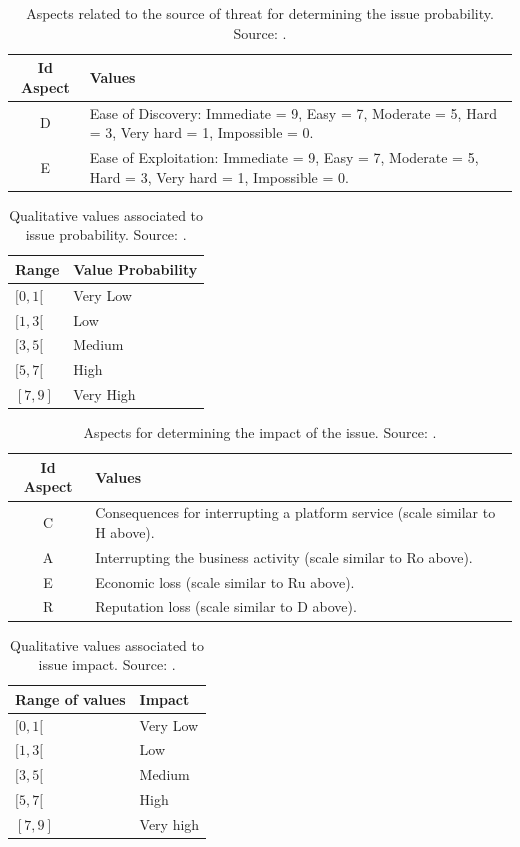 \documentclass[conference]{IEEEtran}
\begin{document}
\begin{table}[!t]
\centering
\caption{Aspects related to the source of threat for determining the issue probability. Source: \cite{ref1}.}
\label{tab:table7}
\small
\begin{tabularx}{\linewidth}{@{}c L@{}}
\toprule
Id Aspect & Values \\
\midrule
D & Ease of Discovery: Immediate = 9, Easy = 7, Moderate = 5, Hard = 3, Very hard = 1, Impossible = 0. \\
E & Ease of Exploitation: Immediate = 9, Easy = 7, Moderate = 5, Hard = 3, Very hard = 1, Impossible = 0. \\
\bottomrule
\end{tabularx}
\end{table}

\begin{table}[!t]
\centering
\caption{Qualitative values associated to issue probability. Source: \cite{ref1}.}
\label{tab:table8}
\small
\begin{tabularx}{\linewidth}{@{}L L@{}}
\toprule
Range & Value Probability \\
\midrule
$[0,1[$ & Very Low \\
$[1,3[$ & Low \\
$[3,5[$ & Medium \\
$[5,7[$ & High \\
$[7,9]$ & Very High \\
\bottomrule
\end{tabularx}
\end{table}

\begin{table}[!t]
\centering
\caption{Aspects for determining the impact of the issue. Source: \cite{ref1}.}
\label{tab:table9}
\small
\begin{tabularx}{\linewidth}{@{}c L@{}}
\toprule
Id Aspect & Values \\
\midrule
C & Consequences for interrupting a platform service (scale similar to H above). \\
A & Interrupting the business activity (scale similar to Ro above). \\
E & Economic loss (scale similar to Ru above). \\
R & Reputation loss (scale similar to D above). \\
\bottomrule
\end{tabularx}
\end{table}

\begin{table}[!t]
\centering
\caption{Qualitative values associated to issue impact. Source: \cite{ref1}.}
\label{tab:table10}
\small
\begin{tabularx}{\linewidth}{@{}L L@{}}
\toprule
Range of values & Impact \\
\midrule
$[0,1[$ & Very Low \\
$[1,3[$ & Low \\
$[3,5[$ & Medium \\
$[5,7[$ & High \\
$[7,9]$ & Very high \\
\bottomrule
\end{tabularx}
\end{table}
\end{document}
